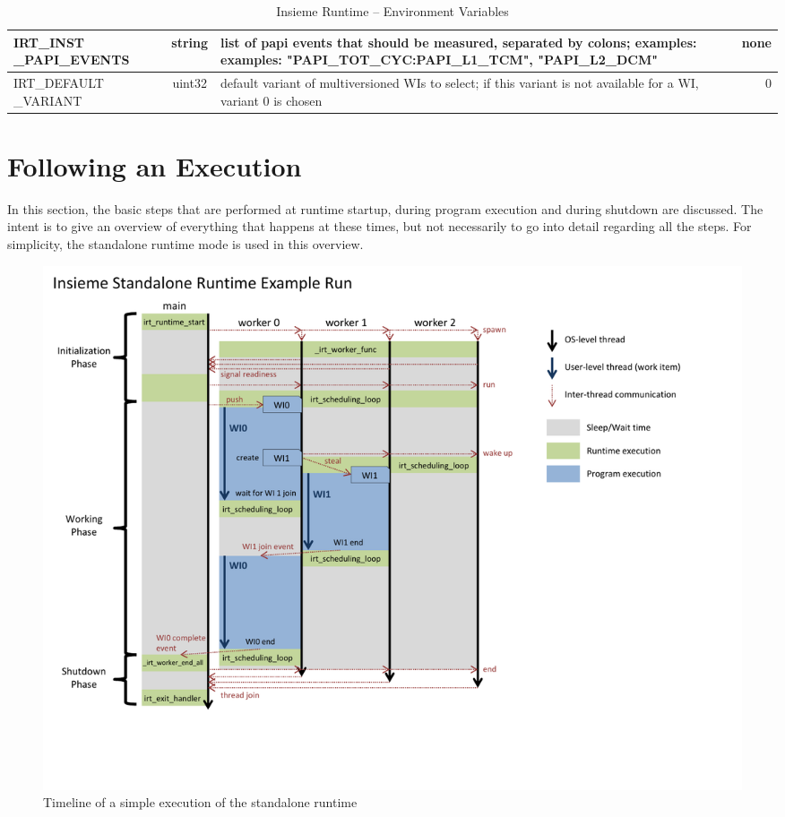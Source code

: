 \begin{table}[htbp]
\begin{tabular}{|p{3cm}|c|p{7cm}|r|}
        IRT\_INST \_PAPI\_EVENTS           & string & list of papi events that should be measured, separated by colons; examples: examples: "PAPI\_TOT\_CYC:PAPI\_L1\_TCM", "PAPI\_L2\_DCM"                                                & none                \\ \hline
        IRT\_DEFAULT \_VARIANT               & uint32 & default variant of multiversioned WIs to select; if this variant is not available for a WI, variant 0 is chosen & 0                   \\ \hline
    \end{tabular}
	\caption{Insieme Runtime -- Environment Variables}
	\label{tab:runtime:options:environment}
\end{table} 


\section{Following an Execution}
In this section, the basic steps that are performed at runtime startup, during program execution and during shutdown are discussed. The intent is to give an overview of everything that happens at these times, but not necessarily to go into detail regarding all the steps. For simplicity, the standalone runtime mode is used in this overview.

\begin{figure}[tb]
	\centering
	\includegraphics[width=\textwidth, trim=2cm 2cm 4cm 2cm]{pics/runtime/standalone_runtime_run.pdf}
	\caption{Timeline of a simple execution of the standalone runtime}
	\label{fig:runtime:execution}
\end{figure}



